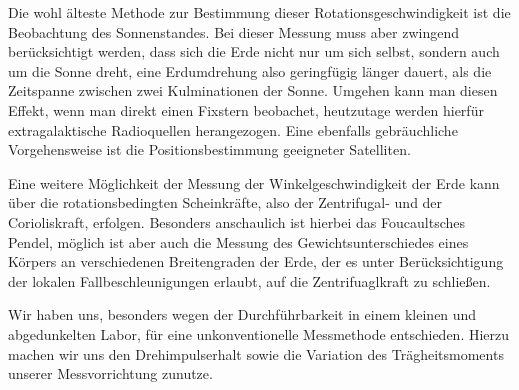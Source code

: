 \documentclass[11pt]{scrartcl}
\begin{document}
Die wohl älteste Methode zur Bestimmung dieser Rotationsgeschwindigkeit ist die Beobachtung des Sonnenstandes.
Bei dieser Messung muss aber zwingend berücksichtigt werden, dass sich die Erde nicht nur um sich selbst, sondern auch um die Sonne dreht, eine Erdumdrehung also geringfügig länger dauert, als die Zeitspanne zwischen zwei Kulminationen der Sonne. Umgehen kann man diesen Effekt, wenn man direkt einen Fixstern beobachet, heutzutage werden hierfür extragalaktische Radioquellen herangezogen. Eine ebenfalls gebräuchliche Vorgehensweise ist die Positionsbestimmung geeigneter Satelliten.

Eine weitere Möglichkeit der Messung der Winkelgeschwindigkeit der Erde kann über die rotationsbedingten Scheinkräfte, also der Zentrifugal- und der Corioliskraft, erfolgen. Besonders anschaulich ist hierbei das Foucaultsches Pendel, möglich ist aber auch die Messung des Gewichtsunterschiedes eines Körpers an verschiedenen Breitengraden der Erde, der es unter Berücksichtigung der lokalen Fallbeschleunigungen erlaubt, auf die Zentrifuaglkraft zu schließen. 

Wir haben uns, besonders wegen der Durchführbarkeit in einem kleinen und abgedunkelten Labor, für eine unkonventionelle Messmethode entschieden. Hierzu machen wir uns den Drehimpulserhalt sowie die Variation des Tr\"agheitsmoments unserer Messvorrichtung zunutze.
\end{document}
